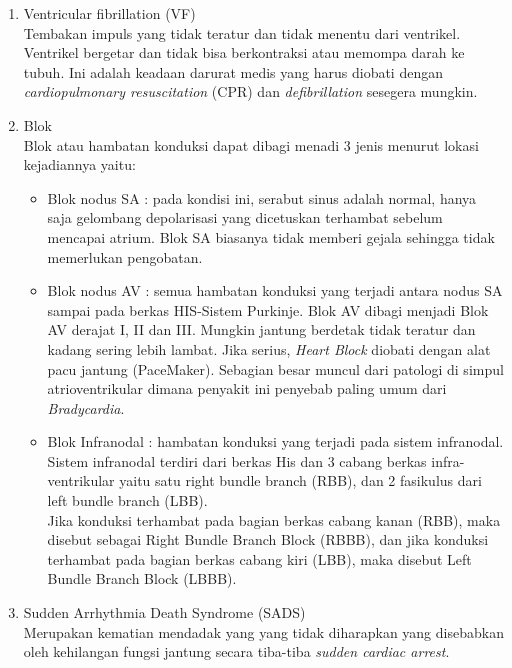 \begin{enumerate}
  \item Ventricular fibrillation (VF) \\
  Tembakan impuls yang tidak teratur dan tidak menentu dari ventrikel. Ventrikel
  bergetar dan tidak bisa berkontraksi atau memompa darah ke tubuh.  Ini adalah
  keadaan darurat medis yang harus diobati  dengan \textit{cardiopulmonary
  resuscitation} (CPR) dan \textit{defibrillation} sesegera mungkin.
    
  \item Blok \\
  Blok atau hambatan konduksi dapat dibagi menadi 3 jenis menurut lokasi
  kejadiannya yaitu:
  \begin{itemize}
    \item Blok nodus SA : pada kondisi ini, serabut sinus adalah normal, hanya
    saja gelombang depolarisasi yang dicetuskan terhambat sebelum mencapai
    atrium. Blok SA biasanya tidak memberi gejala sehingga tidak memerlukan
    pengobatan.
    \item Blok nodus AV : semua hambatan konduksi yang terjadi antara nodus SA
    sampai pada berkas HIS-Sistem Purkinje. Blok AV dibagi menjadi Blok AV
    derajat I, II dan III. Mungkin jantung berdetak tidak teratur dan kadang sering
	lebih lambat. Jika serius, \textit{Heart Block} diobati dengan alat pacu
	jantung (PaceMaker). Sebagian besar muncul dari patologi di simpul
	atrioventrikular dimana penyakit ini penyebab paling umum dari \textit{Bradycardia}.
    \item Blok Infranodal : hambatan konduksi yang terjadi pada sistem
    infranodal. Sistem infranodal terdiri dari berkas His dan 3 cabang berkas
    infra-ventrikular yaitu satu right bundle branch (RBB), dan 2 fasikulus dari
    left bundle branch (LBB).\\
	Jika konduksi terhambat pada bagian berkas cabang kanan (RBB), maka disebut
	sebagai Right Bundle Branch Block (RBBB), dan jika konduksi terhambat pada
	bagian berkas cabang kiri (LBB), maka disebut Left Bundle Branch Block (LBBB).
  \end{itemize}
  
  \item Sudden Arrhythmia Death Syndrome (SADS) \\
  Merupakan kematian mendadak yang yang tidak diharapkan yang disebabkan oleh
  kehilangan fungsi jantung secara tiba-tiba \textit{sudden cardiac arrest}.
	
\end{enumerate}

